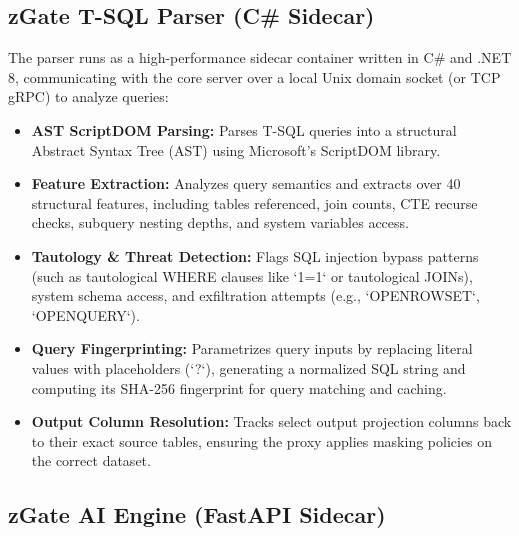 
\subsection{zGate T-SQL Parser (C\# Sidecar)}

The parser runs as a high-performance sidecar container written in C\# and .NET 8, communicating with the core server over a local Unix domain socket (or TCP gRPC) to analyze queries:
\begin{itemize}
    \item \textbf{AST ScriptDOM Parsing:} Parses T-SQL queries into a structural Abstract Syntax Tree (AST) using Microsoft's ScriptDOM library.
    \item \textbf{Feature Extraction:} Analyzes query semantics and extracts over 40 structural features, including tables referenced, join counts, CTE recurse checks, subquery nesting depths, and system variables access.
    \item \textbf{Tautology \& Threat Detection:} Flags SQL injection bypass patterns (such as tautological WHERE clauses like `1=1` or tautological JOINs), system schema access, and exfiltration attempts (e.g., `OPENROWSET`, `OPENQUERY`).
    \item \textbf{Query Fingerprinting:} Parametrizes query inputs by replacing literal values with placeholders (`?`), generating a normalized SQL string and computing its SHA-256 fingerprint for query matching and caching.
    \item \textbf{Output Column Resolution:} Tracks select output projection columns back to their exact source tables, ensuring the proxy applies masking policies on the correct dataset.
\end{itemize}


\subsection{zGate AI Engine (FastAPI Sidecar)}

